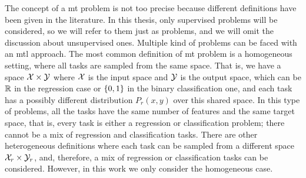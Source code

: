 The concept of a \acrshort{mt} problem is not too precise because different definitions have been given in the literature. 
In this thesis, only supervised problems will be considered, so we will refer to them just as problems, and we will omit the discussion about unsupervised ones. 
%
Multiple kind of problems can be faced with an \acrshort{mtl} approach. 
%
The most common definition of \acrshort{mt} problem is a homogeneous setting, where all tasks are sampled from the same space. That is, we have a space $\mathcal{X} \times \mathcal{Y}$ where $\mathcal{X}$ is the input space and $\mathcal{Y}$ is the output space, which can be $\mathbb{R}$ in the regression case or $\left\{0, 1\right\}$ in the binary classification one, and each task has a possibly different distribution $P_r(x, y)$ over this shared space.
In this type of problems, all the tasks have the same number of features and the same target space, that is, every task is either a regression or classification problem; there cannot be a mix of regression and classification tasks.
%
There are other heterogeneous definitions where each task can be sampled from a different space $\mathcal{X}_r \times \mathcal{Y}_r$, and, therefore, a mix of regression or classification tasks can be considered. However, in this work we only consider the homogeneous case.
%

